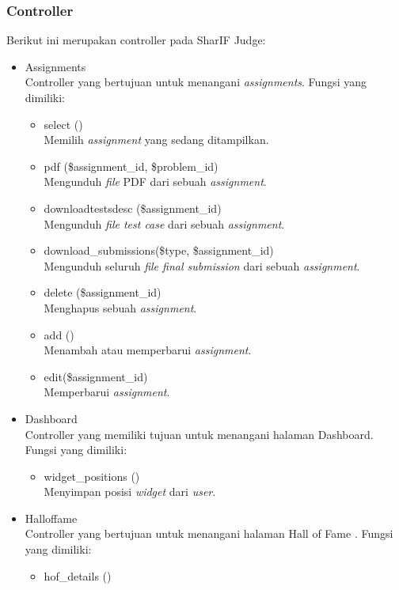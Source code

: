 \subsubsection{Controller}
Berikut ini merupakan controller pada SharIF Judge:
\begin{itemize}
    \item Assignments \\
 Controller yang bertujuan untuk menangani \textit{assignments}. Fungsi yang dimiliki:
    \begin{itemize}
        \item select ()\\
 Memilih \textit{assignment} yang sedang ditampilkan.
        \item pdf (\$assignment\_id, \$problem\_id) \\
 Mengunduh \textit{file} PDF dari sebuah \textit{assignment}.
        \item downloadtestsdesc (\$assignment\_id)\\
 Mengunduh \textit{file test case} dari sebuah \textit{assignment}.
        \item download\_submissions(\$type, \$assignment\_id)\\
 Mengunduh seluruh \textit{file final submission} dari sebuah \textit{assignment}.
    \item delete (\$assignment\_id)\\
 Menghapus sebuah \textit{assignment}.
    \item add () \\
 Menambah atau memperbarui \textit{assignment}.
    \item edit(\$assignment\_id) \\
 Memperbarui \textit{assignment}.
    \end{itemize}
    \item Dashboard \\
 Controller yang memiliki tujuan untuk menangani halaman Dashboard. Fungsi yang dimiliki:
    \begin{itemize}
        \item widget\_positions ()\\
 Menyimpan posisi \textit{widget} dari \textit{user}.
    \end{itemize}
    \item Halloffame \\
 Controller yang bertujuan untuk menangani halaman Hall of Fame . Fungsi yang dimiliki:
    \begin{itemize}
        \item hof\_details ()\\

\end{itemize}
\end{itemize}
